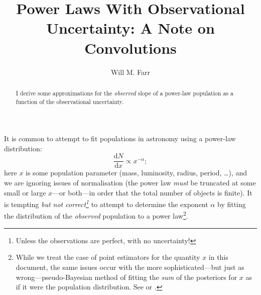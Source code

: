 \documentclass[modern]{aastex62}
\newcommand{\dd}{\ensuremath{\mathrm{d}}}
\newcommand{\diff}[2]{\ensuremath{\frac{\dd #1}{\dd #2}}}
\begin{document}
\title{Power Laws With Observational Uncertainty: A Note on Convolutions}
\author[0000-0003-1540-8562]{Will M. Farr}

\begin{abstract}
%
I derive some approximations for the \emph{observed} slope of a power-law
population as a function of the observational uncertainty.
%
\end{abstract}

\section*{} %

It is common to attempt to fit populations in astronomy using a power-law
distribution:
%
\begin{equation}
  \diff{N}{x} \propto x^{-\alpha};
\end{equation}
%
here $x$ is some population parameter (mass, luminosity, radius, period,
\ldots), and we are ignoring issues of normalisation (the power law \emph{must}
be truncated at some small or large $x$---or both---in order that the total
number of objects is finite).  It is tempting \emph{but not
correct\footnote{Unless the observations are perfect, with no uncertainty!}} to
attempt to determine the exponent $\alpha$ by fitting the distribution of the
\emph{observed} population to a power law\footnote{While we treat the case of
point estimators for the quantity $x$ in this document, the same issues occur
with the more sophisticated---but just as wrong---pseudo-Bayesian method of
fitting the \emph{sum} of the posteriors for $x$ as if it were the population
distribution.  See \citet{Hogg2010} or \citet{Mandel2010}.}.
\end{document}
